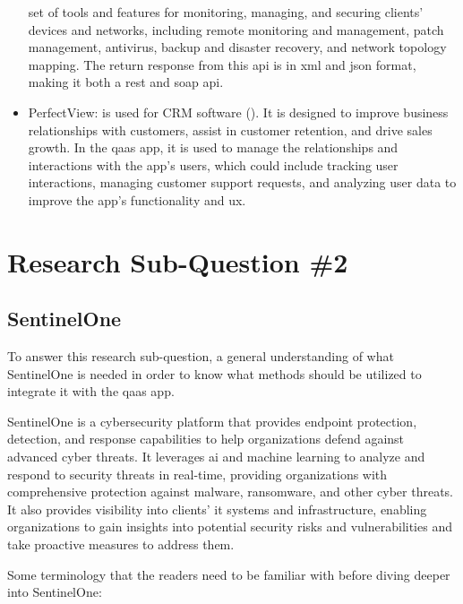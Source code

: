 \begin{multicols}{2}
\begin{itemize}
                  set of tools and features for monitoring, managing, and securing clients' devices and networks,
                  including remote monitoring and management, patch management, antivirus, backup and disaster
                  recovery, and network topology mapping. The return response from this \acrshort{api} is in \acrshort{xml}
                  and \acrshort{json} format, making it both a \acrshort{rest} and \acrshort{soap} \acrshort{api}.
            \item PerfectView: is used for \gls{CRM} software (\textit{\cite{perfectView}}). It is designed to
                  improve business relationships with customers, assist in customer retention, and drive sales growth.
                  In the \acrshort{qaas} app, it is used to manage the relationships and interactions with the app's users,
                  which could include tracking user interactions, managing customer support requests, and analyzing user
                  data to improve the app's functionality and \acrshort{ux}.
      \end{itemize}
      \section{Research Sub-Question \#2}
      \subsection{SentinelOne} %
      To answer this research sub-question, a general understanding of what SentinelOne is needed in order to know what
      methods should be utilized to integrate it with the \acrshort{qaas} app.

      SentinelOne is a cybersecurity platform that provides endpoint protection, detection, and response capabilities to
      help organizations defend against advanced cyber threats. It leverages \acrlong{ai} and machine learning to analyze
      and respond to security threats in real-time, providing organizations with comprehensive protection against malware,
      ransomware, and other cyber threats. It also provides visibility into clients' \acrshort{it} systems and infrastructure,
      enabling organizations to gain insights into potential security risks and vulnerabilities and take proactive measures
      to address them.

      Some terminology that the readers need to be familiar with before diving deeper into SentinelOne:


\end{multicols}
